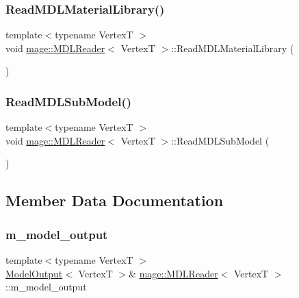 \subsubsection{\texorpdfstring{Read\+M\+D\+L\+Material\+Library()}{ReadMDLMaterialLibrary()}}
{\footnotesize\ttfamily template$<$typename VertexT $>$ \\
void \hyperlink{classmage_1_1_m_d_l_reader}{mage\+::\+M\+D\+L\+Reader}$<$ VertexT $>$\+::Read\+M\+D\+L\+Material\+Library (\begin{DoxyParamCaption}{ }\end{DoxyParamCaption})\hspace{0.3cm}{\ttfamily [private]}}

\hypertarget{classmage_1_1_m_d_l_reader_a78e12dbf59382cde7a56c323918d5bc2}{}\label{classmage_1_1_m_d_l_reader_a78e12dbf59382cde7a56c323918d5bc2} 
\subsubsection{\texorpdfstring{Read\+M\+D\+L\+Sub\+Model()}{ReadMDLSubModel()}}
{\footnotesize\ttfamily template$<$typename VertexT $>$ \\
void \hyperlink{classmage_1_1_m_d_l_reader}{mage\+::\+M\+D\+L\+Reader}$<$ VertexT $>$\+::Read\+M\+D\+L\+Sub\+Model (\begin{DoxyParamCaption}{ }\end{DoxyParamCaption})\hspace{0.3cm}{\ttfamily [private]}}



\subsection{Member Data Documentation}
\hypertarget{classmage_1_1_m_d_l_reader_a41392308792749b78657497b69add850}{}\label{classmage_1_1_m_d_l_reader_a41392308792749b78657497b69add850} 
\subsubsection{\texorpdfstring{m\+\_\+model\+\_\+output}{m\_model\_output}}
{\footnotesize\ttfamily template$<$typename VertexT $>$ \\
\hyperlink{structmage_1_1_model_output}{Model\+Output}$<$ VertexT $>$\& \hyperlink{classmage_1_1_m_d_l_reader}{mage\+::\+M\+D\+L\+Reader}$<$ VertexT $>$\+::m\+\_\+model\+\_\+output\hspace{0.3cm}{\ttfamily [private]}}

